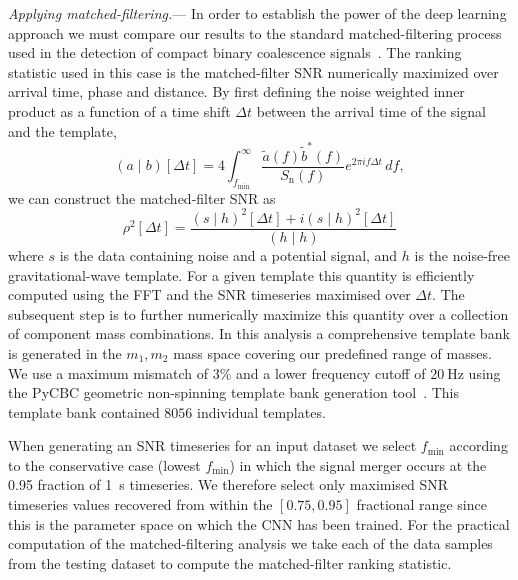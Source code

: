 \documentclass[%
showpacs,
 amsmath,amssymb,
 aps,
 twocolumn,
 prl,
 reprint,
floatfix,
]{revtex4-1}
\begin{document}
%
%
\textit{Applying matched-filtering.}---
%
%
In order to establish the power of the deep learning approach we must compare
our results to the standard matched-filtering process used in the detection of
compact binary coalescence
signals~\cite{PhysRevD.85.122006,2013PhRvD..87b4033B}. The ranking statistic
used in this case is the matched-filter \ac{SNR} numerically maximized over
arrival time, phase and distance. By first defining the noise weighted inner
product as a function of a time shift $\Delta t$ between the arrival time of
the signal and the template,
%
%
\begin{equation}\label{eq:inner}
(a\mid b)[\Delta t] =
4\int_{f_{\mathrm{min}}}^{\infty}\frac{\tilde{a}(f)\tilde{b}^{*}(f)}{S_{\mathrm{n}}(f)}e^{2\pi i
f\Delta t}\,df,
\end{equation}
%
we can construct the matched-filter \ac{SNR} as 
%
\begin{equation}
\rho^{2}[\Delta t]=\frac{(s\mid h)^{2}[\Delta t] + i(s\mid h)^{2}[\Delta t]}{(h\mid h)}
\end{equation}
%
where $s$ is the data containing noise and a potential signal, and $h$ is the
noise-free gravitational-wave template. For a given template this quantity is
efficiently computed using the \ac{FFT} and the \ac{SNR} timeseries maximised
over $\Delta t$. The subsequent step is to further numerically maximize this
quantity over a collection of component mass combinations. In this analysis a
comprehensive template bank is generated in the $m_{1},m_{2}$ mass space
covering our predefined range of masses. We use a maximum mismatch of $3\%$ and
a lower frequency cutoff of $20~\mathrm{Hz}$ using the PyCBC geometric
non-spinning template bank generation
tool~\cite{pycbc-software,0264-9381-33-21-215004}. This template bank contained
$8056$ individual templates. 

%
%
When generating an \ac{SNR} timeseries for an input dataset we select
$f_{\mathrm{min}}$ according to the conservative case (lowest
$f_{\mathrm{min}}$) in which the signal merger occurs at the 0.95 fraction of
1~s timeseries. We therefore select only maximised \ac{SNR} timeseries
values recovered from within the $[0.75,0.95]$ fractional range since this is
the parameter space on which the \ac{CNN} has been trained. For the practical
computation of the matched-filtering analysis we take each of the data samples
from the testing dataset to compute the matched-filter ranking statistic.
\end{document}
